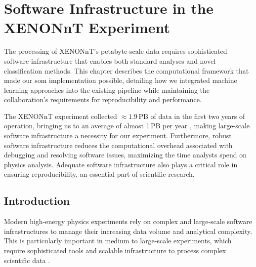 \section{Software Infrastructure in the XENONnT Experiment}
\label{sec: Software_Infrastructure}

The processing of XENONnT's petabyte-scale data requires sophisticated software infrastructure that enables both standard analyses and novel classification methods. This chapter describes the computational framework that made our \acrfull{som} implementation possible, detailing how we integrated machine learning approaches into the existing pipeline while maintaining the collaboration's requirements for reproducibility and performance.

The XENONnT experiment collected $\approx1.9$\,PB of data in the first two years of operation, bringing us to an average of almost 1\,PB per year \cite{tda_Aprile_2023}, making large-scale software infrastructure a necessity for our experiment. Furthermore, robust software infrastructure reduces the computational overhead associated with debugging and resolving software issues, maximizing the time analysts spend on physics analysis. Adequate software infrastructure also plays a critical role in ensuring reproducibility, an essential part of scientific research.

\subsection{Introduction}


Modern high-energy physics experiments rely on complex and large-scale software infrastructures to manage their increasing data volume and analytical complexity. This is particularly important in medium to large-scale experiments, which require sophisticated tools and scalable infrastructure to process complex scientific data \cite{jacobs2025whitepapersoftwareinfrastructure, Clemencic_2017, HEPSoftwareFoundation:2017ggl, agapopoulou:hal-05018428}. 



